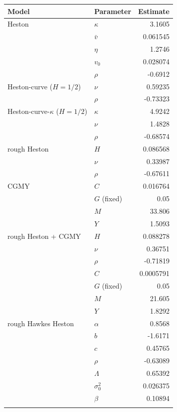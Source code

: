 \begin{tabular}{llr}
\toprule
Model & Parameter & Estimate\\
\midrule
Heston & $\kappa$ & 3.1605\\
 & $\bar v$ & 0.061545\\
 & $\eta$ & 1.2746\\
 & $v_0$ & 0.028074\\
 & $\rho$ & -0.6912\\
\addlinespace
Heston-curve ($H=1/2$) & $\nu$ & 0.59235\\
 & $\rho$ & -0.73323\\
\addlinespace
Heston-curve-$\kappa$ ($H=1/2$) & $\kappa$ & 4.9242\\
 & $\nu$ & 1.4828\\
 & $\rho$ & -0.68574\\
\addlinespace
rough Heston & $H$ & 0.086568\\
 & $\nu$ & 0.33987\\
 & $\rho$ & -0.67611\\
\addlinespace
CGMY & $C$ & 0.016764\\
 & $G$ (fixed) & 0.05\\
 & $M$ & 33.806\\
 & $Y$ & 1.5093\\
\addlinespace
rough Heston + CGMY & $H$ & 0.088278\\
 & $\nu$ & 0.36751\\
 & $\rho$ & -0.71819\\
 & $C$ & 0.0005791\\
 & $G$ (fixed) & 0.05\\
 & $M$ & 21.605\\
 & $Y$ & 1.8292\\
\addlinespace
rough Hawkes Heston & $\alpha$ & 0.8568\\
 & $b$ & -1.6171\\
 & $c$ & 0.45765\\
 & $\rho$ & -0.63089\\
 & $\Lambda$ & 0.65392\\
 & $\sigma_0^2$ & 0.026375\\
 & $\beta$ & 0.10894\\
\addlinespace
\bottomrule
\end{tabular}
